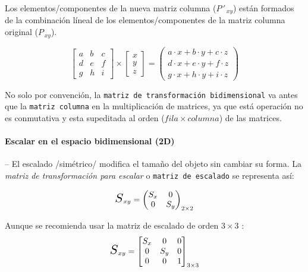 \documentclass[10pt, twocolumn, landscape, a4paper]{article}
\begin{document}
\noindent Los elementos/componentes de la nueva matriz columna ($P\,'_{\,xy}$) están formados de la combinación líneal de los elementos/componentes de la matriz columna original ($P_{\,xy}$).

$$
 \begin{bmatrix} a & b & c \\ d & e & f \\ g & h & i \end{bmatrix} \times \begin{bmatrix} x \\ y \\ z \end{bmatrix} = \begin{pmatrix} a \cdot x + b \cdot y + c \cdot z \\ d \cdot x + e \cdot y + f \cdot z \\ g \cdot x + h \cdot y + i \cdot z \end{pmatrix}
$$

\noindent No solo por convención, la {\tt matriz de transformación bidimensional} va antes que la {\tt matriz columna} en la multiplicación de matrices, ya que está operación no es conmutativa y esta supeditada al orden ($fila{\times}columna$) de las matrices.

\paragraph*{Escalar en el espacio bidimensional (2D)} -- El escalado /simétrico/ modifica el tamaño del objeto sin cambiar su forma. La \emph{matriz de transformación para escalar} o {\tt matriz de escalado} se representa así:

$$
\scalebox{1.5}{$S$}_{xy} =
\begin{pmatrix}
S_{x} & 0 \\
0 & S_{y} 
\end{pmatrix}_{2 \times 2}
$$

\noindent Aunque se recomienda usar la matriz de escalado de orden $3{\times}3$ :
$$
\scalebox{1.5}{$S$}_{xy} =
\begin{bmatrix}
S_{x} & 0 & 0 \\
0 & S_{y} & 0 \\
0 & 0 & 1
\end{bmatrix}_{3 \times 3}
$$
\end{document}
